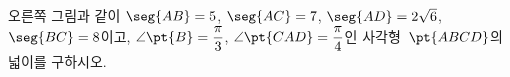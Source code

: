 \noindent\begin{minipage}[t]{0.58\linewidth}\vspace{0pt}\raggedright 오른쪽 그림과 같이 $\seg{AB}=5$, $\seg{AC}=7$, $\seg{AD}=2\sqrt{6}$, $\seg{BC}=8$이고, $\angle\pt{B}=\dfrac{\pi}{3}$, $\angle\pt{CAD}=\dfrac{\pi}{4}$인 사각형~$\pt{ABCD}$의 넓이를 구하시오.\end{minipage}\hfill\begin{minipage}[t]{0.4\linewidth}\vspace{0pt}\centering \resizebox{\ifdim\width>\linewidth\linewidth\else\width\fi}{!}{}\end{minipage}\par
